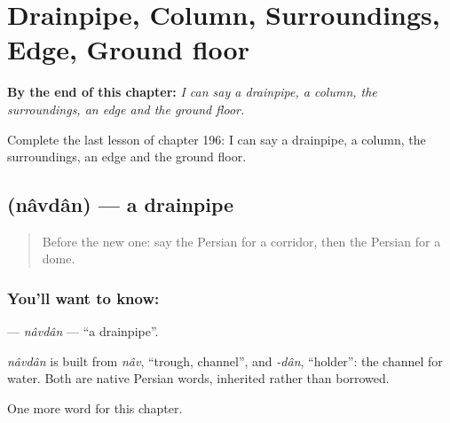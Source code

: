 
\chapter{Drainpipe, Column, Surroundings, Edge, Ground floor}
\label{ch:fa-drainpipe-column-surroundings-edge-ground-floor}

\begin{chapteropening}
\textbf{By the end of this chapter:} \emph{I can say a drainpipe, a column, the surroundings, an edge and the ground floor.}

Complete the last lesson of chapter 196: I can say a drainpipe, a column, the surroundings, an edge and the ground floor.
\end{chapteropening}

\section[\texorpdfstring{\fa{ناودان} (nâvdân)}{ناودان (nâvdân)}]{ (nâvdân) — a drainpipe}

\label{lesson:FA-C196-navdan}



\begin{quote}
Before the new one: say the Persian for a corridor, then the Persian for a dome.
\end{quote}

\subsection*{You'll want to know: }
\textbf{} — \emph{nâvdân} — \textquotedblleft{}a drainpipe\textquotedblright{}.

\begin{cousinweb}
\emph{nâvdân} is built from \emph{nâv}, \textquotedblleft{}trough, channel\textquotedblright{}, and \emph{-dân}, \textquotedblleft{}holder\textquotedblright{}: the channel for water. Both are native Persian words, inherited rather than borrowed.
\end{cousinweb}

\begin{grammarlens}[title={What you've built}]
One more word for this chapter.
\end{grammarlens}

